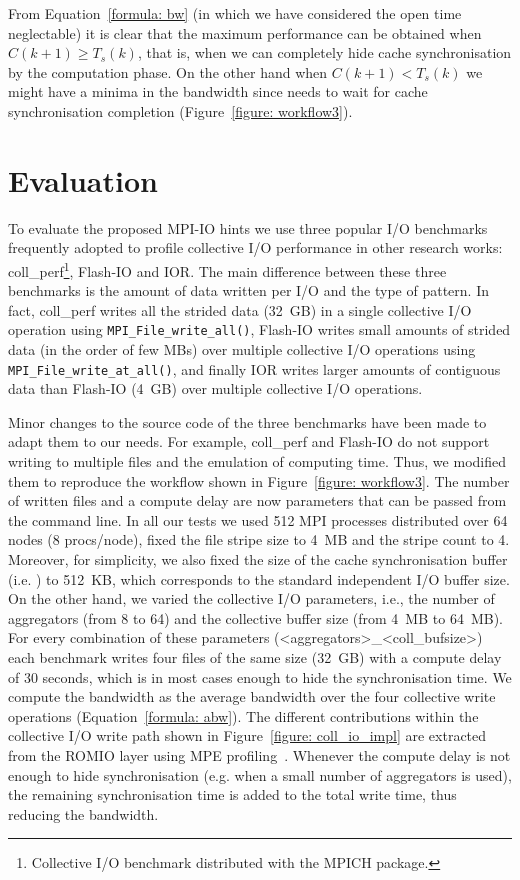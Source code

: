 From Equation~\ref{formula: bw} (in which we have considered the open time neglectable) it is clear that the maximum performance can be obtained when $C(k+1) \geq T_s(k)$, that is, when we can completely hide cache synchronisation by the computation phase. 
On the other hand when $C(k+1) < T_s(k)$ we might have a minima in the bandwidth since  needs to wait for cache synchronisation completion (Figure~\ref{figure: workflow3}). 

\section{Evaluation}
\label{sec: evaluation}
To evaluate the proposed MPI-IO hints we use three popular I/O benchmarks frequently adopted to profile collective I/O performance in other research works: coll\_perf\footnote{Collective I/O benchmark distributed with the MPICH package.}, Flash-IO and IOR. 
The main difference between these three benchmarks is the amount of data written per I/O and the type of pattern. In fact, coll\_perf writes all the strided data (32~GB) in a single collective I/O operation using \texttt{MPI\_File\_write\_all()}, Flash-IO 
writes small amounts of strided data (in the order of few MBs) over multiple collective I/O operations using \texttt{MPI\_File\_write\_at\_all()}, and finally IOR writes larger amounts of contiguous data than Flash-IO (4~GB) over multiple collective I/O operations.

Minor changes to the source code of the three benchmarks have been made to adapt them to our needs. For example, coll\_perf and Flash-IO do not support writing to multiple files and the emulation of computing time. Thus, we modified them to reproduce the 
workflow shown in Figure~\ref{figure: workflow3}. The number of written files and a compute delay are now parameters that can be passed from the command line. In all our tests we used 512 MPI processes distributed over 64 nodes (8 procs/node), fixed the 
file stripe size to 4~MB and the stripe count to 4. Moreover, for simplicity, we also fixed the size of the cache synchronisation buffer (i.e. ) to 512~KB, which corresponds to the standard independent I/O buffer size. On 
the other hand, we varied the collective I/O parameters, i.e., the number of aggregators (from 8 to 64) and the collective buffer size (from 4~MB to 64~MB). For every combination of these parameters (<aggregators>\_<coll\_bufsize>) each benchmark writes 
four files of the same size (32~GB) with a compute delay of 30 seconds, which is in most cases enough to hide the synchronisation time. We compute the bandwidth as the average bandwidth over the four collective write operations (Equation~\ref{formula: abw}). 
The different  contributions within the collective I/O write path shown in Figure~\ref{figure: coll_io_impl} are extracted from the ROMIO layer using MPE profiling~\cite{mpe}. Whenever the compute delay is not enough to hide synchronisation (e.g. when a 
small number of aggregators is used), the remaining synchronisation time is added to the total write time, thus reducing the bandwidth.

